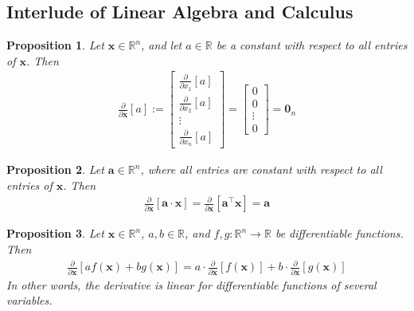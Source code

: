 \documentclass[12pt, a4paper]{article}
\newtheorem{proposition}{Proposition}
\theoremstyle{definition}
\begin{document}
	\subsection*{Interlude of Linear Algebra and Calculus}
	\begin{tcolorbox}
		\begin{proposition}
			Let $\mathbf{x}\in\mathbb{R}^n$, and let $a\in\mathbb{R}$ be a constant with
			respect to all entries of $\mathbf{x}$. Then
			\begin{align}
				\frac{\partial}{\partial\mathbf{x}}[a] := \begin{bmatrix}
					\frac{\partial}{\partial x_1}[a]\\
					\frac{\partial}{\partial x_2}[a]\\
					\vdots\\
					\frac{\partial}{\partial x_n}[a]
				\end{bmatrix}
				=\begin{bmatrix}
					0\\
					0\\
					\vdots\\
					0
				\end{bmatrix}
				=\mathbf{0}_{n}
				\label{eqn:deriv-constant}
			\end{align}
		\end{proposition}
	\end{tcolorbox}
	\begin{tcolorbox}
		\begin{proposition}
			Let $\mathbf{a}\in\mathbb{R}^n$, where all entries are constant with respect to
			all entries of $\mathbf{x}$. Then
			\begin{align}
				\frac{\partial}{\partial\mathbf{x}}[\mathbf{a}\cdot \mathbf{x}]=
				\frac{\partial}{\partial \mathbf{x}}[\mathbf{a}^\top \mathbf{x}]=\mathbf{a}
				\label{eqn:deriv-const-dot}
			\end{align}
		\end{proposition}
	\end{tcolorbox}
	\begin{tcolorbox}
		\begin{proposition}
			Let $\mathbf{x}\in\mathbb{R}^n$, $a,b\in\mathbb{R}$, and $f,g:\mathbb{R}^n\to\mathbb{R}$
			be differentiable functions. Then
			\begin{align}
				\frac{\partial}{\partial \mathbf{x}}[af(\mathbf{x}) + b g(\mathbf{x})]
				= a \cdot \frac{\partial}{\partial \mathbf{x}} [f(\mathbf{x})]
				+ b \cdot \frac{\partial}{\partial \mathbf{x}} [g(\mathbf{x})]
				\label{eqn:deriv-of-sum}
			\end{align}
			In other words, the derivative is linear for differentiable functions of several variables.
		\end{proposition}
	\end{tcolorbox}
	
\end{document}
